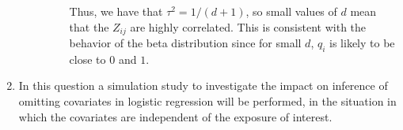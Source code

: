 \documentclass[letterpaper,11pt]{article}
\begin{document}
\begin{enumerate}
\begin{enumerate}
\begin{description}
      Thus, we have that $\tau^2 = 1/\left(d + 1\right)$, so small values of $d$
      mean that the $Z_{ij}$ are highly correlated. This is consistent with the
      behavior of the beta distribution since for small $d$, $q_i$ is likely to
      be close to $0$ and $1$.
    \end{description}
\end{enumerate}
\item In this question a simulation study to investigate the impact on inference
  of omitting covariates in logistic regression will be performed, in the
  situation in which the covariates are independent of the exposure of interest.
\end{enumerate}
\end{document}
